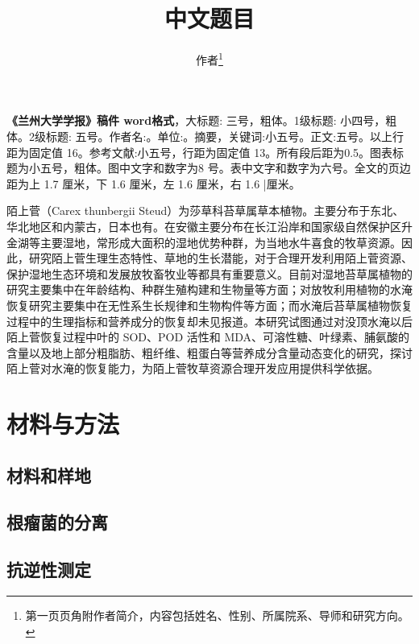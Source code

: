 \documentclass[a4paper]{ctexart}
\title[\rmfamily\zihao{3}English title]{
    中文题目
}
\author[\rmfamily\zihao{5}Wang Xu, Chen Huijie]{
    作者\footnote{
    第一页页角附作者简介，内容包括姓名、性别、所属院系、导师和研究方向。}
}
\begin{document}
    \textbf{《兰州大学学报》稿件 word格式}，大标题: 三号，粗体。1级标题: 小四号，粗体。2级标题: 五号。作者名:。单位:。摘要，关键词:小五号。正文:五号。以上行距为固定值 16。参考文献:小五号，行距为固定值 13。所有段后距为0.5。图表标题为小五号，粗体。图中文字和数字为8 号。表中文字和数字为六号。全文的页边距为上 1.7 厘米，下 1.6 厘米，左 1.6 厘米，右 1.6 |厘米。
    

    \maketitle


    \vspace{1em}
    陌上菅（Carex thunbergii Steud）为莎草科苔草属草本植物。主要分布于东北、华北地区和内蒙古，日本也有\cite{lundgren1985seasonal}。在安徽主要分布在长江沿岸和国家级自然保护区升金湖等主要湿地，常形成大面积的湿地优势种群，为当地水牛喜食的牧草资源。因此，研究陌上菅生理生态特性、草地的生长潜能，对于合理开发利用陌上菅资源、保护湿地生态环境和发展放牧畜牧业等都具有重要意义。目前对湿地苔草属植物的研究主要集中在年龄结构\cite{黄高宝2005植物化感作用影响因素的再认识}、种群生殖构建\cite{郭海林2007结缕草属优良品系}和生物量\cite{郑慧莹1999松嫩平原盐生植物与盐碱化草地的恢复,carneiro1960slash}等方面；对放牧利用植物的水淹恢复研究主要集中在无性系生长规律和生物构件等方面\cite{辛希孟1994信息技术与信息服务国际研讨会论文集,钟文发1996非线性规划在可燃毒物配置中的应用,Rosenthall1963Proceedings,黄东益2003旗草内生真菌的特异}；而水淹后苔草属植物恢复过程中的生理指标和营养成分的恢复却未见报道。本研究试图通过对没顶水淹以后陌上菅恢复过程中叶的 SOD、POD 活性和 MDA、可溶性糖、叶绿素、脯氨酸的含量以及地上部分粗脂肪、粗纤维、粗蛋白等营养成分含量动态变化的研究，探讨陌上菅对水淹的恢复能力，为陌上菅牧草资源合理开发应用提供科学依据。
    \section{材料与方法}
    \subsection{材料和样地}
    \subsection{根瘤菌的分离}
    \subsection{抗逆性测定}
\end{document}
